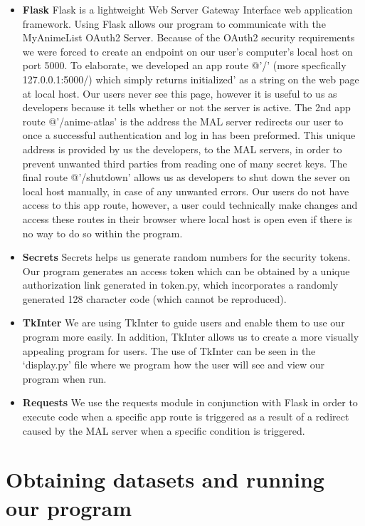 \documentclass[fontsize=11pt]{article}
\begin{document}
\begin{itemize}
    \item \textbf{Flask} Flask is a lightweight Web Server Gateway Interface web application framework. Using Flask allows our program to communicate with the MyAnimeList OAuth2 Server. Because of the OAuth2 security requirements we were forced to create an endpoint on our user's computer's local host on port 5000. To elaborate, we developed an app route @'/' (more specfically 127.0.0.1:5000/) which simply returns initialized' as a string on the web page at local host. Our users never see this page, however it is useful to us as developers because it tells whether or not the server is active. The 2nd app route @'/anime-atlas' is the address the MAL server redirects our user to once a successful authentication and log in has been preformed. This unique address is provided by us the developers, to the MAL servers, in order to prevent unwanted third parties from reading one of many secret keys. The final route @'/shutdown' allows us as developers to shut down the sever on local host manually, in case of any unwanted errors. Our users do not have access to this app route, however, a user could technically make changes and access these routes in their browser where local host is open even if there is no way to do so within the program. 
    \item \textbf{Secrets} Secrets helps us generate random numbers for the security tokens. Our program generates an access token which can be obtained by a unique authorization link generated in token.py, which incorporates a randomly generated 128 character code (which cannot be reproduced).
    \item \textbf{TkInter} We are using TkInter to guide users and enable them to use our program more easily. In addition, TkInter allows us to create a more visually appealing program for users. The use of TkInter can be seen in the `display.py' file where we program how the user will see and view our program when run.
    \item \textbf{Requests} We use the requests module in conjunction with Flask in order to execute code when a specific app route is triggered as a result of a redirect caused by the MAL server when a specific condition is triggered. 

\end{itemize}

\section*{Obtaining datasets and running our program}
\end{document}
